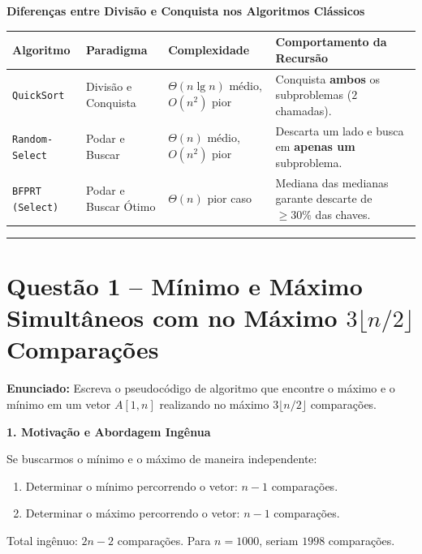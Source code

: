 \documentclass[11pt,a4paper]{article}
\newcommand{\topico}[1]{\par\medskip\textbf{\color{azul}#1}\par}
\newcommand{\questao}[2]{\section*{Questão #1 -- #2}}
\begin{document}
\topico{Diferenças entre Divisão e Conquista nos Algoritmos Clássicos}
\begin{center}
\small
\setlength{\tabcolsep}{4pt}
\begin{tabular}{p{2.4cm}p{2.8cm}p{3.8cm}p{5.8cm}}
\toprule
\textbf{Algoritmo} & \textbf{Paradigma} & \textbf{Complexidade} & \textbf{Comportamento da Recursão} \\ \midrule
\texttt{QuickSort} & Divisão e Conquista & $\Theta(n \lg n)$ médio, $O(n^2)$ pior & Conquista \textbf{ambos} os subproblemas ($2$ chamadas). \\
\texttt{Random-Select} & Podar e Buscar & $\Theta(n)$ médio, $O(n^2)$ pior & Descarta um lado e busca em \textbf{apenas um} subproblema. \\
\texttt{BFPRT (Select)} & Podar e Buscar Ótimo & $\Theta(n)$ pior caso & Mediana das medianas garante descarte de $\ge 30\%$ das chaves. \\
\bottomrule
\end{tabular}
\end{center}

\vspace{10pt}
\hrule
\vspace{6pt}

\questao{1}{Mínimo e Máximo Simultâneos com no Máximo $3\lfloor n/2 \rfloor$ Comparações}

\textbf{Enunciado:} Escreva o pseudocódigo de algoritmo que encontre o máximo e o mínimo em um vetor $A[1, n]$ realizando no máximo $3\lfloor n/2 \rfloor$ comparações.

\topico{1. Motivação e Abordagem Ingênua}
Se buscarmos o mínimo e o máximo de maneira independente:
\begin{enumerate}
    \item Determinar o mínimo percorrendo o vetor: $n - 1$ comparações.
    \item Determinar o máximo percorrendo o vetor: $n - 1$ comparações.
\end{enumerate}
Total ingênuo: $2n - 2$ comparações. Para $n = 1000$, seriam $1998$ comparações.
\end{document}
